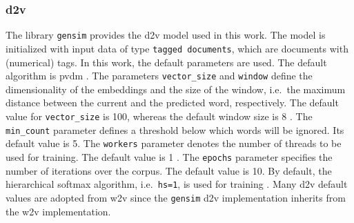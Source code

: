 \subsubsection*{\ac{d2v}}\label{subsubsec:impl-doc2vec}

The library \texttt{gensim} provides the \ac{d2v} model used in this work.
The model is initialized with input data of type \texttt{tagged documents}, which are documents with (numerical) tags.
In this work, the default parameters are used.
The default algorithm is \ac{pvdm} \cite{gensim-word2vec-init}.
The parameters \texttt{vector\_size} and \texttt{window} define the dimensionality of the embeddings and the size of the window, 
i.e.\ the maximum distance between the current and the predicted word, respectively.
The default value for \texttt{vector\_size} is 100, whereas the default window size is 8 \cite{gensim-word2vec-init, gensim-doc2vec-init}.
The \texttt{min\_count} parameter defines a threshold below which words will be ignored.
Its default value is 5.
The \texttt{workers} parameter denotes the number of threads to be used for training.
The default value is 1 \cite{gensim-word2vec-init}.
The \texttt{epochs} parameter specifies the number of iterations over the corpus.
The default value is 10.
By default, the hierarchical softmax algorithm, i.e.\ \texttt{hs=1}, is used for training \cite{gensim-doc2vec}.
Many \ac{d2v} default values are adopted from \ac{w2v} since the \texttt{gensim} \ac{d2v} implementation inherits from the \ac{w2v} implementation.
